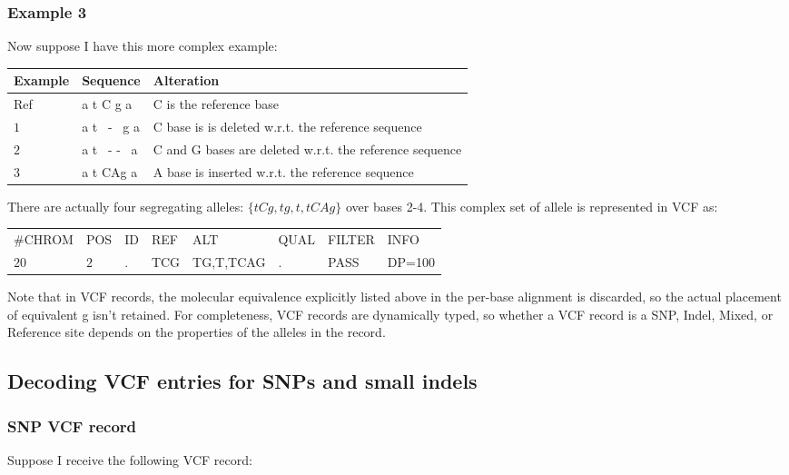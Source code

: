 \documentclass[8pt]{article}
\begin{document}
\subsubsection{Example 3}
Now suppose I have this more complex example:

\vspace{0.3cm}
\begin{tabular}{ | l | l | l | }
\hline
Example & Sequence & Alteration \\ \hline
Ref & a t C g a & C is the reference base \\ \hline
$1$   & a t \ - \ g a & C base is is deleted w.r.t. the reference sequence \\ \hline
$2$   & a t \ - - \ a & C and G bases are deleted w.r.t. the reference sequence\\ \hline
$3$   & a t CAg a & A base is inserted w.r.t. the reference sequence \\ \hline
\end{tabular}

\vspace{0.3cm}
There are actually four segregating alleles: $\{tCg,tg,t,tCAg\}$ over bases 2-4. This complex set of allele is represented in VCF as:

\vspace{0.3cm}
\begin{tabular}{ l l l l l l l l}
	\#CHROM & POS & ID & REF & ALT & QUAL & FILTER & INFO \\
	$20$ & $2$ & . & TCG & TG,T,TCAG & . & PASS & DP=100 \\
\end{tabular}
\vspace{0.3cm}

Note that in VCF records, the molecular equivalence explicitly listed above in the per-base alignment is discarded, so the actual placement of equivalent g isn't retained. For completeness, VCF records are dynamically typed, so whether a VCF record is a SNP, Indel, Mixed, or Reference site depends on the properties of the alleles in the record.

\subsection{Decoding VCF entries for SNPs and small indels}
\subsubsection{SNP VCF record}
Suppose I receive the following VCF record:
\end{document}
